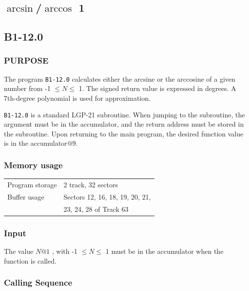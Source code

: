 \documentclass{article}
\begin{document}
\newpage

\subsection{$\arcsin$/$\arccos$ 1}
\label{sec:arcsin_arccos_1}

\subsection*{B1-12.0}

\subsubsection*{PURPOSE}
The program \texttt{B1-12.0} calculates either the arcsine or the arccosine of a given number from -1 $\le N \le$ 1. The signed return value is expressed in degrees. A 7th-degree polynomial is used for approximation.

\texttt{B1-12.0} is a standard LGP-21 subroutine. When jumping to the subroutine, the argument must be in the accumulator, and the return address must be stored in the subroutine. Upon returning to the main program, the desired function value is in the accumulator$@9$.


\subsubsection*{Memory usage}
\begin{center}
\begin{tabular}{ll}
    \toprule
    Program storage & 2 track, 32 sectors \\
    Buffer usage & Sectors 12, 16, 18, 19, 20, 21, \\
     & 23, 24, 28 of Track 63 \\
    \bottomrule
\end{tabular}
\end{center}

\subsubsection*{Input}
The value $N@1$ , with -1 $\le N \le$ 1 must be in the accumulator when the function is called.

\subsubsection*{Calling Sequence}
\end{document}
